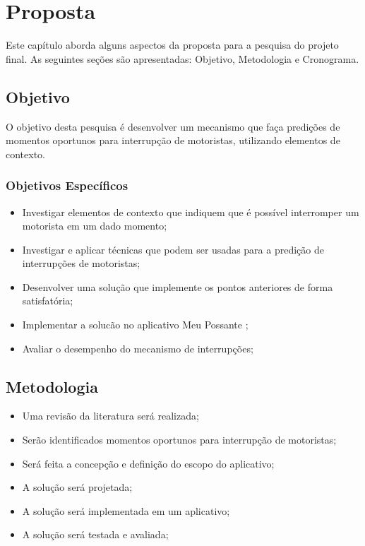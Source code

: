 \chapter{Proposta}
\label{proposta}
Este capítulo aborda alguns aspectos da proposta para a pesquisa do projeto final. As seguintes seções são
apresentadas: Objetivo, Metodologia e Cronograma.

\section{Objetivo}
\label{objetivo}
O objetivo desta pesquisa é desenvolver um mecanismo que faça predições de momentos oportunos para interrupção de
motoristas, utilizando elementos de contexto.

\subsection{Objetivos Específicos}
\label{objetivos-esp}
\begin{itemize}
  \item Investigar elementos de contexto que indiquem que é possível interromper um motorista em um dado momento;
  \item Investigar e aplicar técnicas que podem ser usadas para a predição de interrupções de motoristas;
  \item Desenvolver uma solução que implemente os pontos anteriores de forma satisfatória;
  \item Implementar a solucão no aplicativo Meu Possante \cite{meupossante};
  \item Avaliar o desempenho do mecanismo de interrupções;
\end{itemize}

\section{Metodologia}
\label{metodologia}
\begin{itemize}
  \item Uma revisão da literatura será realizada;
  \item Serão identificados momentos oportunos para interrupção de motoristas;
  \item Será feita a concepção e definição do escopo do aplicativo;
  \item A solução será projetada;
  \item A solução será implementada em um aplicativo;
  \item A solução será testada e avaliada;
\end{itemize}

